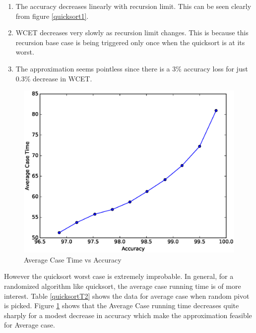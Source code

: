 \begin{enumerate}
\item The accuracy decreases linearly with recursion limit. This can be seen clearly from figure \ref{quicksort1}.
\item WCET decreases very slowly as recursion limit changes. This is because this recursion base case is being triggered only once when the quicksort is at its worst.
\item The approximation seems pointless since there is a 3\% accuracy loss for just 0.3\% decrease in WCET.
\end{enumerate}



\begin{figure}
  \includegraphics[width=0.95\linewidth]{Results/quicksort23.eps}
  \caption{Average Case Time vs Accuracy}
  \label{quicksort23}
\end{figure}

However the quicksort worst case is extremely improbable. In general, for a randomized algorithm like quicksort, the average case running time is of more interest. Table \ref{quicksortT2} shows the data for average case when random pivot is picked. Figure \ref{quicksort23} shows that the Average Case running time decreases quite sharply for a modest decrease in accuracy which make the approximation feasible for Average case.




